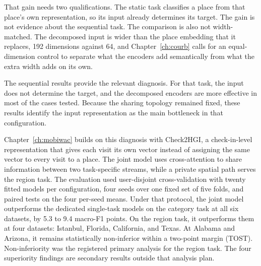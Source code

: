 
That gain needs two qualifications. The static task classifies a place from that
place's own representation, so its input already determines its target. The gain is not
evidence about the sequential task. The comparison is also not width-matched. The
decomposed input is wider than the place embedding that it replaces, 192 dimensions
against 64, and Chapter~\ref{ch:courb} calls for an equal-dimension control to separate
what the encoders add semantically from what the extra width adds on its own.

The sequential results provide the relevant diagnosis. For that task, the input does
not determine the target, and the decomposed encoders are more effective in most of
the cases tested. Because the sharing topology remained fixed, these results identify
the input representation as the main bottleneck in that configuration.

Chapter~\ref{ch:mobiwac} builds on this diagnosis with Check2HGI, a check-in-level
representation that gives each visit its own vector instead of assigning the same
vector to every visit to a place. The joint model uses cross-attention to share
information between two task-specific
streams, while a private spatial path serves the region task. The evaluation used
user-disjoint cross-validation with twenty
fitted models per configuration, four seeds over one fixed set of five folds, and paired
tests on the four per-seed means. Under that protocol, the joint model outperforms the
dedicated single-task models on the category task at all six datasets, by 5.3 to 9.4
macro-F1 points. On the region task, it outperforms them at four datasets: Istanbul,
Florida, California, and Texas. At Alabama and Arizona, it remains statistically
non-inferior within a two-point margin (TOST). Non-inferiority was the registered
primary analysis for the region task. The four superiority findings are secondary
results outside that analysis plan.


